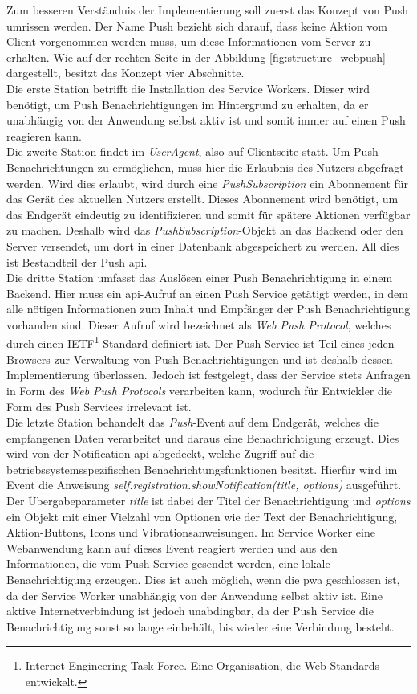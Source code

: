Zum besseren Verständnis der Implementierung soll zuerst das Konzept von Push umrissen werden.
Der Name Push bezieht sich darauf, dass keine Aktion vom Client vorgenommen werden muss, um diese Informationen vom Server zu erhalten.
Wie auf der rechten Seite in der Abbildung \ref{fig:structure_webpush} dargestellt, besitzt das Konzept vier Abschnitte.\\
Die erste Station betrifft die Installation des Service Workers.
Dieser wird benötigt, um Push Benachrichtigungen im Hintergrund zu erhalten, da er unabhängig von der Anwendung selbst aktiv ist und somit immer auf einen Push reagieren kann.\\
Die zweite Station findet im \textit{UserAgent}, also auf Clientseite statt.
Um Push Benachrichtungen zu ermöglichen, muss hier die Erlaubnis des Nutzers abgefragt werden.
Wird dies erlaubt, wird durch eine \textit{PushSubscription} ein Abonnement für das Gerät des aktuellen Nutzers erstellt.
Dieses Abonnement wird benötigt, um das Endgerät eindeutig zu identifizieren und somit für spätere Aktionen verfügbar zu machen.
Deshalb wird das \textit{PushSubscription}-Objekt an das Backend oder den Server versendet, um dort in einer Datenbank abgespeichert zu werden.
All dies ist Bestandteil der Push \ac{api}.\\
Die dritte Station umfasst das Auslösen einer Push Benachrichtigung in einem Backend.
Hier muss ein \ac{api}-Aufruf an einen Push Service getätigt werden, in dem alle nötigen Informationen zum Inhalt und Empfänger der Push Benachrichtigung vorhanden sind.
Dieser Aufruf wird bezeichnet als \textit{Web Push Protocol}, welches durch einen IETF\footnote{Internet Engineering Task Force. Eine Organisation, die Web-Standards entwickelt.}-Standard definiert ist.
Der Push Service ist Teil eines jeden Browsers zur Verwaltung von Push Benachrichtigungen und ist deshalb dessen Implementierung überlassen.
Jedoch ist festgelegt, dass der Service stets Anfragen in Form des \textit{Web Push Protocols} verarbeiten kann, wodurch für Entwickler die Form des Push Services irrelevant ist.\\
Die letzte Station behandelt das \textit{Push}-Event auf dem Endgerät, welches die empfangenen Daten verarbeitet und daraus eine Benachrichtigung erzeugt.
Dies wird von der Notification \ac{api} abgedeckt, welche Zugriff auf die betriebssystemsspezifischen Benachrichtungsfunktionen besitzt.
Hierfür wird im Event die Anweisung \textit{self.registration.showNotifica\-tion(title, options)} ausgeführt.
Der Übergabeparameter \textit{title} ist dabei der Titel der Benachrichtigung und \textit{options} ein Objekt mit einer Vielzahl von Optionen wie der Text der Benachrichtigung, Aktion-Buttons, Icons und Vibrationsanweisungen.%
Im Service Worker eine Webanwendung kann auf dieses Event reagiert werden und aus den Informationen, die vom Push Service gesendet werden, eine lokale Benachrichtigung erzeugen.
Dies ist auch möglich, wenn die \ac{pwa} geschlossen ist, da der Service Worker unabhängig von der Anwendung selbst aktiv ist.
Eine aktive Internetverbindung ist jedoch unabdingbar, da der Push Service die Benachrichtigung sonst so lange einbehält, bis wieder eine Verbindung besteht.

